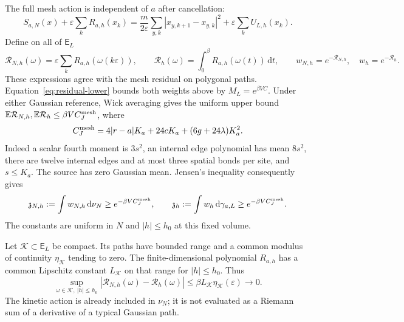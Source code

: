 \documentclass[11pt]{article}
\numberwithin{equation}{section}
\theoremstyle{definition}
\newcommand{\E}{\mathbb E}
\newcommand{\dd}{\,\mathrm d}
\newcommand{\eps}{\varepsilon}
\begin{document}
The full mesh action is independent of $a$ after cancellation:
\begin{equation}
 S_{a,N}(x)+\eps\sum_kR_{a,h}(x_k)
 =\frac m{2\eps}\sum_{y,k}|x_{y,k+1}-x_{y,k}|^2
   +\eps\sum_kU_{L,h}(x_k). \label{eq:split-cancellation}
\end{equation}
Define on all of $\mathsf E_L$
\[
 \mathcal R_{N,h}(\omega)=\eps\sum_kR_{a,h}(\omega(k\eps)),\qquad
 \mathcal R_h(\omega)=\int_0^\beta R_{a,h}(\omega(t))\dd t,
 \qquad w_{N,h}=e^{-\mathcal R_{N,h}},\quad w_h=e^{-\mathcal R_h}.
\]
These expressions agree with the mesh residual on polygonal paths.
Equation~\eqref{eq:residual-lower} bounds both weights above by
$M_L=e^{\beta VC}$.  Under either Gaussian reference, Wick averaging
gives the uniform upper bound $\E\mathcal R_{N,h},\E\mathcal R_h
\leq\beta V C_J^{\rm mesh}$, where
\[
 C_J^{\rm mesh}=4|r-a|K_a+24cK_a+(6g+24\lambda)K_a^2.
\]
Indeed a scalar fourth moment is $3s^2$, an internal edge polynomial
has mean $8s^2$, there are twelve internal edges and at most three spatial
bonds per site, and $s\leq K_a$. The source has zero Gaussian mean.
Jensen's inequality consequently gives
\begin{equation}
 \mathfrak z_{N,h}:=\int w_{N,h}\dd\nu_N\geq e^{-\beta VC_J^{\rm mesh}},
 \qquad \mathfrak z_h:=\int w_h\dd\gamma_{a,L}
                         \geq e^{-\beta VC_J^{\rm mesh}}.
 \label{eq:mesh-normalizer-lower}
\end{equation}
The constants are uniform in $N$ and $|h|\leq h_0$ at this fixed volume.

Let $\mathcal K\subset\mathsf E_L$ be compact. Its paths have bounded
range and a common modulus of continuity $\eta_{\mathcal K}$ tending to
zero. The finite-dimensional polynomial $R_{a,h}$ has a common Lipschitz
constant $L_{\mathcal K}$ on that range for $|h|\leq h_0$. Thus
\begin{equation}
 \sup_{\omega\in\mathcal K,\ |h|\leq h_0}
 |\mathcal R_{N,h}(\omega)-\mathcal R_h(\omega)|
 \leq\beta L_{\mathcal K}\eta_{\mathcal K}(\eps)\longrightarrow0.
 \label{eq:compact-riemann-residual}
\end{equation}
The kinetic action is already included in $\nu_N$; it is not evaluated as
a Riemann sum of a derivative of a typical Gaussian path.
\end{document}
